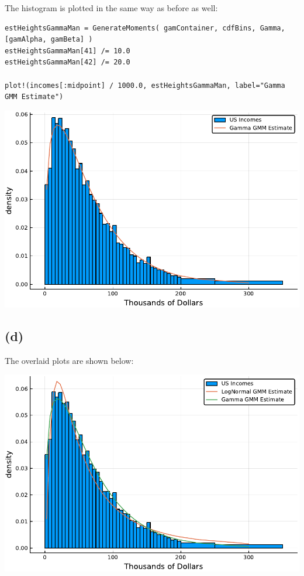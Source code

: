 \documentclass[12pt]{paper}
\begin{document}
The histogram is plotted in the same way as before as well:

\begin{verbatim}
estHeightsGammaMan = GenerateMoments( gamContainer, cdfBins, Gamma, [gamAlpha, gamBeta] )
estHeightsGammaMan[41] /= 10.0
estHeightsGammaMan[42] /= 20.0

plot!(incomes[:midpoint] / 1000.0, estHeightsGammaMan, label="Gamma GMM Estimate")
\end{verbatim}

\begin{centering}
  \includegraphics{gammaMan.pdf}
\end{centering}

\subsection{(d)}

The overlaid plots are shown below:

\begin{centering}
  \includegraphics{allTogetherNow.pdf}
\end{centering}
\end{document}
